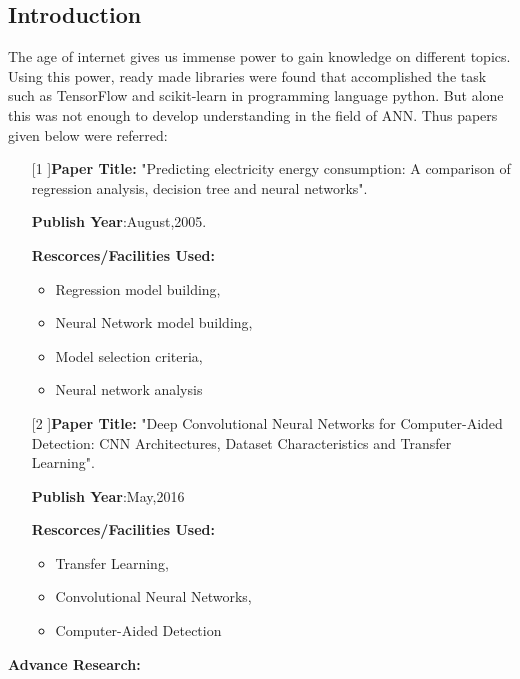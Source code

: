 \documentclass[12pt,times,a4paper]{report}
\begin{document}
{{\begin{normalsize}
\section{Introduction}
\par
The age of internet gives us immense power to gain knowledge on different topics. Using this power, ready made libraries were found that accomplished the task such as TensorFlow and scikit-learn in programming language python. But alone this was not enough to develop understanding in the field of ANN. Thus papers given below were referred: 
\begin{itemize}
\item[[1]]\textbf{Paper Title:} "Predicting electricity energy consumption: A comparison of regression
analysis, decision tree and neural networks".
\par
\textbf{Publish Year}:August,2005.
\par
\textbf{Rescorces/Facilities Used:}
\begin{itemize}
    \item 	Regression model building,
	\item Neural Network model building,
\item Model selection criteria,
\item Neural network analysis
\end{itemize}
\item[[2]]\textbf{Paper Title:} "Deep Convolutional Neural Networks for Computer-Aided Detection: CNN Architectures, Dataset Characteristics and Transfer Learning".
\par
\textbf{Publish Year}:May,2016
\par
\textbf{Rescorces/Facilities Used:}
\begin{itemize}
    \item Transfer Learning,
\item Convolutional Neural Networks,
\item Computer-Aided Detection
\end{itemize}
\end{itemize}
\par
\textbf{Advance Research:}
\par

\end{normalsize}}}
\end{document}

